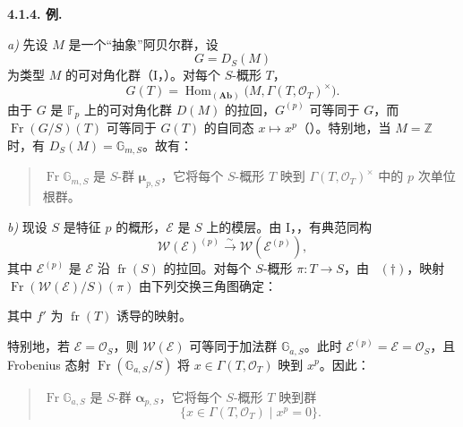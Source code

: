 \medskip
\noindent\textbf{4.1.4. 例.}
\label{sga3:VIIA:4.1.4}

\smallskip
\noindent\textit{a)}
先设 \(M\) 是一个“抽象”阿贝尔群，设
\[
  G=D_S(M)
\]
为类型 \(M\) 的可对角化群（I，）。对每个 \(S\)-概形 \(T\)，
\[
  G(T)
  =
  \operatorname{Hom}_{(\mathbf{Ab})}
    \bigl(M,\Gamma(T,\mathcal O_T)^\times\bigr).
\]
由于 \(G\) 是 \(\mathbb F_p\) 上的可对角化群 \(D(M)\) 的拉回，\(G^{(p)}\) 可等同于 \(G\)，而 \(\operatorname{Fr}(G/S)(T)\) 可等同于 \(G(T)\) 的自同态 \(x\mapsto x^p\)（）。特别地，当 \(M=\mathbb Z\) 时，有 \(D_S(M)=\mathbb G_{m,S}\)。故有：

\begin{quote}
\(\operatorname{Fr}\mathbb G_{m,S}\) 是 \(S\)-群 \(\boldsymbol\mu_{p,S}\)，它将每个 \(S\)-概形 \(T\) 映到 \(\Gamma(T,\mathcal O_T)^\times\) 中的 \(p\) 次单位根群。
\end{quote}

\smallskip
\noindent\textit{b)}
现设 \(S\) 是特征 \(p\) 的概形，\(\mathcal E\) 是 \(S\) 上的模层。由 I，，有典范同构
\[
  \mathcal W(\mathcal E)^{(p)}
  \xrightarrow{\sim}
  \mathcal W(\mathcal E^{(p)}),
\]
其中 \(\mathcal E^{(p)}\) 是 \(\mathcal E\) 沿 \(\operatorname{fr}(S)\) 的拉回。对每个 \(S\)-概形 \(\pi:T\to S\)，由 ~\((\dagger)\)，映射 \(\operatorname{Fr}(\mathcal W(\mathcal E)/S)(\pi)\) 由下列交换三角图确定：
\begin{center}
  \label{sga3:VIIA:4.1.4-vector-group-frobenius-triangle}
  
\end{center}
其中 \(f'\) 为 \(\operatorname{fr}(T)\) 诱导的映射。

特别地，若 \(\mathcal E=\mathcal O_S\)，则 \(\mathcal W(\mathcal E)\) 可等同于加法群 \(\mathbb G_{a,S}\)。此时 \(\mathcal E^{(p)}=\mathcal E=\mathcal O_S\)，且 Frobenius 态射 \(\operatorname{Fr}(\mathbb G_{a,S}/S)\) 将 \(x\in\Gamma(T,\mathcal O_T)\) 映到 \(x^p\)。因此：

\begin{quote}
\(\operatorname{Fr}\mathbb G_{a,S}\) 是 \(S\)-群 \(\boldsymbol\alpha_{p,S}\)，它将每个 \(S\)-概形 \(T\) 映到群
\[
  \bigl\{x\in\Gamma(T,\mathcal O_T)\mid x^p=0\bigr\}.
\]
\end{quote}

